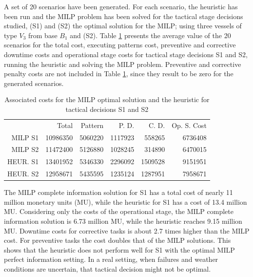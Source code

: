A set of 20 scenarios have been generated. For each scenario, the heuristic has been run and the MILP problem has been solved for the tactical stage decisions studied, (S1) and (S2) the optimal solution for the MILP; using three vessels of type $V_3$ from base $B_1$ and (S2). Table \ref{tab:experiments} presents the average value of the 20 scenarios for the total cost, executing patterns cost, preventive and corrective downtime costs and operational stage costs for tactical stage decisions S1 and S2, running the heuristic and solving the MILP problem. Preventive and corrective penalty costs are not included in Table \ref{tab:experiments}, since they result to be zero for the generated scenarios.

\begin{table}[h]
	\centering
	\caption{Associated costs for the MILP optimal solution and the heuristic for tactical decisions S1 and S2}
	\label{tab:experiments}
\begin{tabular}{rrrrrr}
         & Total    & Pattern & P. D.   & C. D.   & Op. S. Cost \\
MILP S1  & 10986350 & 5060220 & 1117923 & 558265  & 6736408     \\
MILP S2  & 11472400 & 5126880 & 1028245 & 314890  & 6470015     \\
HEUR. S1 & 13401952 & 5346330 & 2296092 & 1509528 & 9151951     \\
HEUR. S2 & 12958671 & 5435595 & 1235124 & 1287951 & 7958671
\end{tabular}
\end{table}

The MILP complete information solution for S1 has a total cost of nearly 11 million monetary units (MU), while the heuristic for S1 has a cost of 13.4 million MU. Considering only the costs of the operational stage, the MILP complete information solution is 6.73 million MU, while the heuristic reaches 9.15 million MU. %
Downtime costs for corrective tasks is about 2.7 times higher than the MILP cost. For preventive tasks the cost doubles that of the MILP solutions. This shows that the heuristic does not perform well for S1 with the optimal MILP perfect information setting. In a real setting, when failures and weather conditions are uncertain, that tactical decision might not be optimal.

